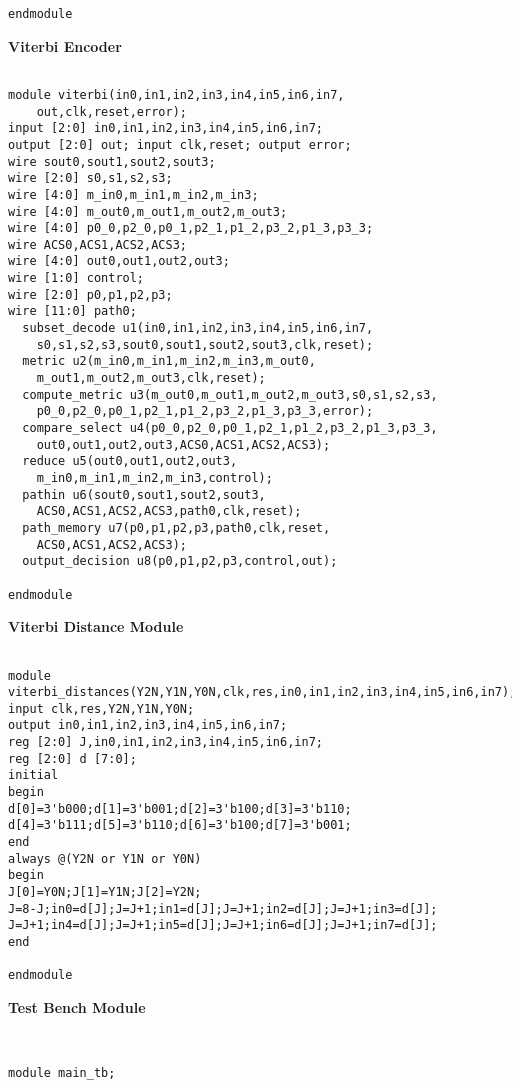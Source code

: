 \documentclass[14pt]{report}
\begin{document}
{\begin{verbatim}
endmodule

\end{verbatim}
\textbf{Viterbi Encoder}\\
\begin{verbatim}

module viterbi(in0,in1,in2,in3,in4,in5,in6,in7,
    out,clk,reset,error);
input [2:0] in0,in1,in2,in3,in4,in5,in6,in7;
output [2:0] out; input clk,reset; output error;
wire sout0,sout1,sout2,sout3;
wire [2:0] s0,s1,s2,s3;
wire [4:0] m_in0,m_in1,m_in2,m_in3;
wire [4:0] m_out0,m_out1,m_out2,m_out3;
wire [4:0] p0_0,p2_0,p0_1,p2_1,p1_2,p3_2,p1_3,p3_3;
wire ACS0,ACS1,ACS2,ACS3;
wire [4:0] out0,out1,out2,out3;
wire [1:0] control;
wire [2:0] p0,p1,p2,p3;
wire [11:0] path0;
  subset_decode u1(in0,in1,in2,in3,in4,in5,in6,in7,
    s0,s1,s2,s3,sout0,sout1,sout2,sout3,clk,reset);
  metric u2(m_in0,m_in1,m_in2,m_in3,m_out0,
    m_out1,m_out2,m_out3,clk,reset);
  compute_metric u3(m_out0,m_out1,m_out2,m_out3,s0,s1,s2,s3,
    p0_0,p2_0,p0_1,p2_1,p1_2,p3_2,p1_3,p3_3,error);
  compare_select u4(p0_0,p2_0,p0_1,p2_1,p1_2,p3_2,p1_3,p3_3,
    out0,out1,out2,out3,ACS0,ACS1,ACS2,ACS3);
  reduce u5(out0,out1,out2,out3,
    m_in0,m_in1,m_in2,m_in3,control);
  pathin u6(sout0,sout1,sout2,sout3,
    ACS0,ACS1,ACS2,ACS3,path0,clk,reset);
  path_memory u7(p0,p1,p2,p3,path0,clk,reset,
    ACS0,ACS1,ACS2,ACS3);
  output_decision u8(p0,p1,p2,p3,control,out);

endmodule

\end{verbatim}
\textbf{Viterbi Distance Module}\\
\begin{verbatim}

module viterbi_distances(Y2N,Y1N,Y0N,clk,res,in0,in1,in2,in3,in4,in5,in6,in7);
input clk,res,Y2N,Y1N,Y0N;
output in0,in1,in2,in3,in4,in5,in6,in7;
reg [2:0] J,in0,in1,in2,in3,in4,in5,in6,in7; 
reg [2:0] d [7:0];
initial 
begin 
d[0]=3'b000;d[1]=3'b001;d[2]=3'b100;d[3]=3'b110;
d[4]=3'b111;d[5]=3'b110;d[6]=3'b100;d[7]=3'b001; 
end
always @(Y2N or Y1N or Y0N) 
begin
J[0]=Y0N;J[1]=Y1N;J[2]=Y2N;
J=8-J;in0=d[J];J=J+1;in1=d[J];J=J+1;in2=d[J];J=J+1;in3=d[J];
J=J+1;in4=d[J];J=J+1;in5=d[J];J=J+1;in6=d[J];J=J+1;in7=d[J];
end

endmodule

\end{verbatim}
\textbf{Test Bench Module}\\
\begin{verbatim}


module main_tb;


\end{verbatim}}
\end{document}
